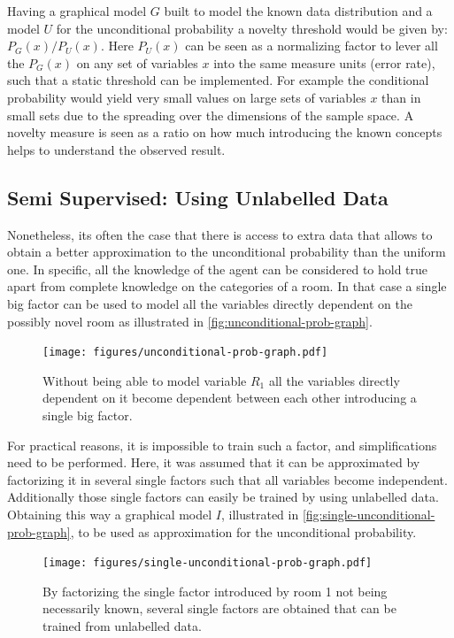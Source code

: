 \documentclass[runningheads,a4paper]{llncs}
\begin{document}
Having a graphical model $G$ built to model the known data distribution and a model
$U$ for the unconditional probability a novelty threshold would be given by:
$P_G(x)/P_U(x)$.
Here $P_{U}(x)$ can be seen as a normalizing factor to lever all the $P_G(x)$ on any set of
variables $x$ into the same measure units (error rate), such that a static threshold can be implemented.
For example the conditional probability would yield very small values on large sets of variables
$x$ than in small sets due to the spreading over the dimensions of the sample space.
A novelty measure is seen as a ratio on how much introducing the known concepts helps to
understand the observed result.


\subsection{Semi Supervised: Using Unlabelled Data}
Nonetheless, its often the case that there is access to extra data that allows to
obtain a better approximation to the unconditional probability than the uniform one.
In specific, all the knowledge of the agent can be considered to hold true apart from
complete knowledge on the categories of a room.
In that case a single big factor can be used to model all the variables directly
dependent on the possibly novel room as illustrated in
\autoref{fig:unconditional-prob-graph}.

\begin{figure}
\centering
\texttt{[image: figures/unconditional-prob-graph.pdf]}
\caption{\label{fig:unconditional-prob-graph}Without being able to model variable $R_1$
all the variables directly dependent on it become dependent between each other introducing
a single big factor.}
\end{figure}

For practical reasons, it is impossible to train such a factor, and simplifications need
to be performed. Here, it was assumed that it can be approximated by factorizing
it in several single factors such that all variables become independent.
Additionally those single factors can easily be trained by using unlabelled data.
Obtaining this way a graphical model $I$,
illustrated in \autoref{fig:single-unconditional-prob-graph},
to be used as approximation for the unconditional probability.

\begin{figure}[h]
\centering
\texttt{[image: figures/single-unconditional-prob-graph.pdf]}
\caption{\label{fig:single-unconditional-prob-graph}By factorizing the single factor
introduced by room 1 not being necessarily known, several single factors are obtained
that can be trained from unlabelled data.}
\end{figure}
\end{document}
